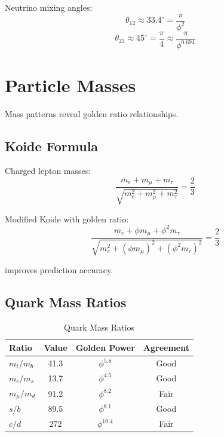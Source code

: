 \begin{proposition}
\label{fa_20:prop:pmns-golden}
Neutrino mixing angles:
\begin{equation}
\theta_{12} \approx 33.4^\circ = \frac{\pi}{\phi^2}
\end{equation}
\begin{equation}
\theta_{23} \approx 45^\circ = \frac{\pi}{4} \approx \frac{\pi}{\phi^{0.694}}
\end{equation}
\end{proposition}

\section{Particle Masses}\label{sec:mass}

Mass patterns reveal golden ratio relationships.

\subsection{Koide Formula}

\begin{definition}
\label{fa_20:def:koide}
Charged lepton masses:
\begin{equation}
\frac{m_e + m_\mu + m_\tau}{\sqrt{m_e^2 + m_\mu^2 + m_\tau^2}} = \frac{2}{3}
\end{equation}
\end{definition}

\begin{proposition}
\label{fa_20:prop:golden-koide}
Modified Koide with golden ratio:
\begin{equation}
\frac{m_e + \phi m_\mu + \phi^2 m_\tau}{\sqrt{m_e^2 + (\phi m_\mu)^2 + (\phi^2 m_\tau)^2}} = \frac{2}{3}
\end{equation}

improves prediction accuracy.
\end{proposition}

\subsection{Quark Mass Ratios}

\begin{table}[h]
\centering
\caption{Quark Mass Ratios}
\begin{tabular}{lccc}
\toprule
Ratio & Value & Golden Power & Agreement \\
\midrule
$m_t/m_b$ & 41.3 & $\phi^{5.8}$ & Good \\
$m_c/m_s$ & 13.7 & $\phi^{4.5}$ & Good \\
$m_\mu/m_d$ & 91.2 & $\phi^{8.2}$ & Fair \\
$s/b$ & 89.5 & $\phi^{8.1}$ & Good \\
$c/d$ & 272 & $\phi^{10.4}$ & Fair \\
\bottomrule
\end{tabular}
\end{table}


